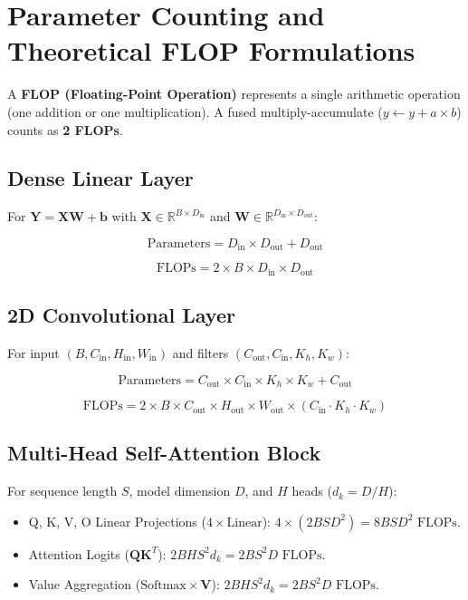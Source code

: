 \documentclass[
  letterpaper,
]{scrbook}
\providecommand{\tightlist}{%
  \setlength{\itemsep}{0pt}\setlength{\parskip}{0pt}}
\begin{document}
\section{Parameter Counting and Theoretical FLOP
Formulations}\label{parameter-counting-and-theoretical-flop-formulations}

A \textbf{FLOP (Floating-Point Operation)} represents a single
arithmetic operation (one addition or one multiplication). A fused
multiply-accumulate (\(y \leftarrow y + a \times b\)) counts as
\textbf{2 FLOPs}.

\subsection{Dense Linear Layer}\label{dense-linear-layer}

For \(\mathbf{Y} = \mathbf{X} \mathbf{W} + \mathbf{b}\) with
\(\mathbf{X} \in \mathbb{R}^{B \times D_{\text{in}}}\) and
\(\mathbf{W} \in \mathbb{R}^{D_{\text{in}} \times D_{\text{out}}}\):

\[\text{Parameters} = D_{\text{in}} \times D_{\text{out}} + D_{\text{out}}\]

\[\text{FLOPs} = 2 \times B \times D_{\text{in}} \times D_{\text{out}}\]

\subsection{2D Convolutional Layer}\label{d-convolutional-layer}

For input \((B, C_{\text{in}}, H_{\text{in}}, W_{\text{in}})\) and
filters \((C_{\text{out}}, C_{\text{in}}, K_h, K_w)\):

\[\text{Parameters} = C_{\text{out}} \times C_{\text{in}} \times K_h \times K_w + C_{\text{out}}\]

\[\text{FLOPs} = 2 \times B \times C_{\text{out}} \times H_{\text{out}} \times W_{\text{out}} \times (C_{\text{in}} \cdot K_h \cdot K_w)\]

\subsection{Multi-Head Self-Attention
Block}\label{multi-head-self-attention-block}

For sequence length \(S\), model dimension \(D\), and \(H\) heads
(\(d_k = D/H\)):

\begin{itemize}
\tightlist
\item
  Q, K, V, O Linear Projections (\(4 \times \text{Linear}\)):
  \(4 \times (2 B S D^2) = 8 B S D^2\text{ FLOPs}\).
\item
  Attention Logits (\(\mathbf{Q} \mathbf{K}^T\)):
  \(2 B H S^2 d_k = 2 B S^2 D\text{ FLOPs}\).
\item
  Value Aggregation (\(\text{Softmax} \times \mathbf{V}\)):
  \(2 B H S^2 d_k = 2 B S^2 D\text{ FLOPs}\).
\end{itemize}
\end{document}

